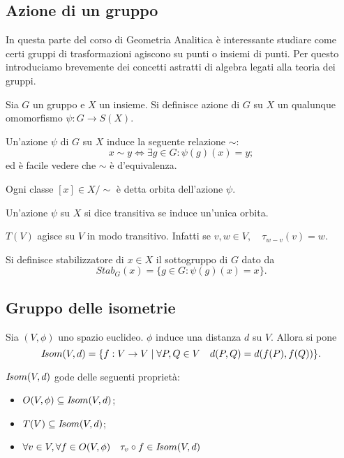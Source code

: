 	\subsection{Azione di un gruppo}

 In questa parte del corso di Geometria Analitica è interessante studiare come certi gruppi di trasformazioni agiscono su punti o insiemi di punti.
 Per questo introduciamo brevemente dei concetti astratti di algebra legati alla teoria dei gruppi.
 
 \begin{definition}
	Sia $G$ un gruppo e $X$ un insieme. Si definisce azione di $G$ su $X$ un qualunque omomorfismo $\psi: G \rightarrow S(X)$.
 \end{definition}
 
 \begin{remark}
	Un'azione $\psi$ di $G$ su $X$ induce la seguente relazione $\sim$:
	\[
		x \sim y \Leftrightarrow \exists g\in G : \psi(g)(x)=y;
	\]
	ed è facile vedere che $\sim$ è d'equivalenza.
 \end{remark}

 \begin{definition}[Orbita]
	Ogni classe $[x]\in X/\!\!\sim$ è detta orbita dell'azione $\psi$.
 \end{definition}
 \begin{definition}
	Un'azione $\psi$ su $X$ si dice transitiva se induce un'unica orbita.
 \end{definition}

 \begin{example}
 $T(V)$ agisce su $V$ in modo transitivo.
 Infatti se $v,w\in V,\quad\tau_{w-v}(v)=w$.
 \end{example}
 
 \begin{definition}[stabilizzatore]
	Si definisce stabilizzatore di $x\in X$ il sottogruppo di $G$ dato da
	\[
		Stab_G(x) = \{g\in G : \psi(g)(x)=x\}.
	\]
 \end{definition}

 
	\subsection{Gruppo delle isometrie}
 
 Sia $(V,\phi)$ uno spazio euclideo. $\phi$ induce una distanza $d$ su $V$. Allora si pone
 $$I\!som(V,d)=\{f:V\to V\;|\;\forall P,Q\in V\quad d(P,Q)=d(f(P),f(Q))\}.$$
 
 \begin{remark} $I\!som( V,d)$ gode delle seguenti proprietà:
 \begin{itemize}
	\item $O(V,\phi)\subseteq I\!som( V,d)$;
	\item $T(V)\subseteq I\!som( V,d)$;
	\item $\forall v\in V,\forall f\in O(V,\phi)\quad\tau_v\circ f\in I\!som( V,d)$
 \end{itemize}
 \end{remark}
 
